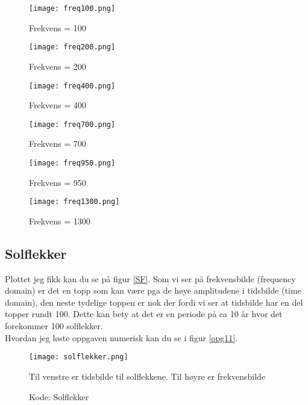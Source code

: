 \documentclass[a4paper,12pt,norsk]{article}
\begin{document}
\begin{figure}[h!]
\begin{minipage}[b]{0.5\linewidth}
\centering
\texttt{[image: freq100.png]} 
\caption{Frekvens = 100}
\label{100}
\end{minipage}
\hspace{0.5cm}
\begin{minipage}[b]{0.5\linewidth}
\centering
\texttt{[image: freq200.png]} 
\caption{Frekvens = 200}
\label{200}
\end{minipage}
\hspace{0.5cm}
\begin{minipage}[b]{0.5\linewidth}
\centering
\texttt{[image: freq400.png]} 
\caption{Frekvens = 400}
\label{400}
\end{minipage}
\hspace{0.5cm}
\begin{minipage}[b]{0.5\linewidth}
\centering
\texttt{[image: freq700.png]} 
\caption{Frekvens = 700}
\label{700}
\end{minipage}
\begin{minipage}[b]{0.5\linewidth}
\centering
\texttt{[image: freq950.png]} 
\caption{Frekvens = 950}
\label{950}
\end{minipage}
\begin{minipage}[b]{0.5\linewidth}
\centering
\texttt{[image: freq1300.png]} 
\caption{Frekvens = 1300}
\label{1300}
\end{minipage}
\end{figure}



\subsection{Solflekker}

Plottet jeg fikk kan du se på figur \vref{SF}. Som vi ser på frekvensbilde (frequency domain) er det en topp som kan være pga de høye amplitudene i tidsbilde (time domain), den neste tydelige toppen er nok der fordi vi ser at tidsbilde har en del topper rundt 100. Dette kan bety at det er en periode på ca 10 år hvor det forekommer 100 solflekker. \\
Hvordan jeg løste oppgaven numerisk kan du se i figur \vref{opg11}.
\begin{figure}[h!]
\texttt{[image: solflekker.png]} 
\caption[Solflekker]{Til venstre er tidsbilde til solflekkene. Til høyre er frekvensbilde}
\label{SF}
\end{figure}
\begin{figure}[h!]
\caption{Kode: Solflekker}

\label{opg11}
\end{figure}
\end{document}
